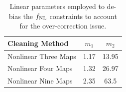 \begin{table}
\begin{center}
\caption{Linear parameters employed to de-bias the $f_{\rm NL}$ constraints to account for the over-correction issue.}\label{tab:debiasparams}
\begin{tabular}{lcc}
\hline
\hline
\textbf{Cleaning Method} & $m_{1}$ & $m_{2}$ \\
\hline
Nonlinear Three Maps & 1.17 & 13.95 \\
Nonlinear Four Maps & 1.32 & 26.97 \\
Nonlinear Nine Maps & 2.35 & 63.5\\
\hline
\end{tabular}
\end{center}
\end{table}
